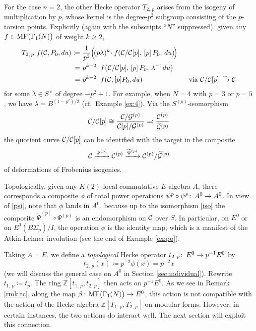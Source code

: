 \documentclass{gtpart}
\theoremstyle{definition}
\theoremstyle{remark}
\def\co{\colon\thinspace}
\newcommand{\mb}[1]{\mathbb{#1}}
\newcommand{\CC}{{\cal C}}
\newcommand{\CG}{{\cal G}}
\newcommand{\BZ}{{\mb Z}}
\newcommand{\MF}{{\rm MF}}
\newcommand{\B}{\beta}
\newcommand{\f}{\phi}
\newcommand{\G}{\Gamma}
\renewcommand{\l}{\lambda}
\newcommand{\ce}{\coloneqq}
\renewcommand{\=}{\approx}
\renewcommand{\-}{\sim}
\numberwithin{equation}{section}
\numberwithin{thm}{section}
\begin{document}
For the case $n = 2$, the other Hecke operator $T_{2,\,p}$ arises from the 
isogeny of multiplication by $p$, whose kernel is the degree-$p^2$ subgroup 
consisting of the $p$-torsion points.  Explicitly (again with the subscripts 
``$N$'' suppressed), given any $f \in \MF\big(\G_1(N)\big)$ of weight 
$k \geq 2$, 
\begin{equation}
 \label{T2p}
 \begin{split}
  T_{2,\,p}~f(\CC, P_0, du) \ce & ~ \frac{1}{p^2} \Big(\! (p \l)^k \!\cdot 
                                  f\!\left(\CC/\CC[p], \, [p]\,P_0, \, 
                                  du\right) \!\!\Big) \\
                              = & ~ p^{k - 2} \!\cdot f\!\left(\CC/\CC[p], \, 
                                  [p]\,P_0, \, \l^{-1} du\right) \\
                              = & ~ p^{k - 2} \!\cdot f(\CC, [p] P_0, du) 
                                  \qquad\qquad\qquad~~ \text{via 
                                  $\CC/\CC[p] \xrightarrow{\sim} \CC$} 
 \end{split}
\end{equation}
for some $\l \in S^\times$ of degree $-p^2 + 1$.  For example, when $N = 4$ with 
$p = 3$ or $p = 5$, we have $\lambda = B^{(1 - p^2)/2}$ (cf.~Example 
\ref{ex:4}).  Via the $S^{(p)}$-isomorphism 
\begin{equation}
 \label{iso}
 \CC/\CC[p] \cong \frac{\CC/\CG^{(p)}}{\CC[p]/\CG^{(p)}} \eqqcolon 
 \frac{\CC^{(p)}}{\widetilde{\CG}^{(p)}} 
\end{equation}
the quotient curve $\CC/\CC[p]$ can be identified with the target in the 
composite 
\[
 \CC \xrightarrow{\Psi^{(p)}} \CC^{(p)} \xrightarrow{\widetilde{\Psi}^{(p)}} 
 \CC^{(p)}/\widetilde{\CG}^{(p)} 
\]
of deformations of Frobenius isogenies.  

Topologically, given any $K(2)$-local commutative $E$-algebra $A$, there 
corresponds a composite $\f$ of total power operations 
$\psi^p \circ \psi^p \co A^0 \to A^0$.  In view of \eqref{psi}, note that $\phi$ 
lands in $A^0$, because up to the isomorphism \eqref{iso} the composite 
$\widetilde{\Psi}^{(p)} \circ \Psi^{(p)}$ is an endomorphism on $\CC$ over $S$.  
In particular, on $E^0$ or on $E^0(B\Sigma_p) / I$, the operation $\phi$ is the 
identity map, which is a manifest of the Atkin-Lehner involution (see the end of 
Example \ref{ex:po}).  

Taking $A = E$, we define a {\em topological} Hecke operator 
$t_{2,\,p} \co E^0 \to p^{-1} E^0$ by 
\begin{equation}
 \label{t2p}
 t_{2,\,p}(x) \ce p^{-2} \phi(x) = p^{-2} x 
\end{equation}
(we will discuss the general case on $A^0$ in Section \ref{sec:individual}).  
Rewrite $t_{1,\,p} \ce t_p$.  The ring $\BZ[t_{1,\,p},t_{2,\,p}]$ then acts on 
$p^{-1} E^0$.  As we see in Remark \ref{rmk:tc}, along the map 
$\B \co \MF\big(\G_1(N)\big) \to E^0$, this action is not compatible with the 
action of the Hecke algebra $\BZ[T_{1,\,p},T_{2,\,p}]$ on modular forms.  
However, in certain instances, the two actions do interact well.  The next 
section will exploit this connection.  
\end{document}
